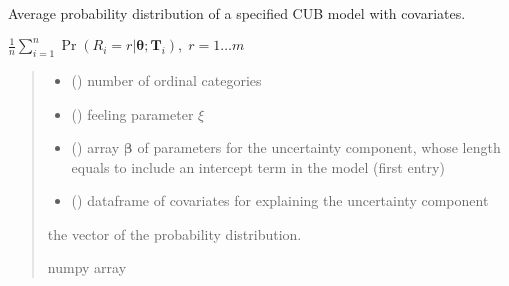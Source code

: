 \documentclass[letterpaper,10pt,english]{sphinxmanual}
\begin{document}
\begin{fulllineitems}
\label{\detokenize{cubmods:cubmods.cub_y0.pmf}}
\pysigstartsignatures
{}
\pysigstopsignatures
\sphinxAtStartPar
Average probability distribution of a specified CUB model 
with covariates.

\sphinxAtStartPar
\(\frac{1}{n} \sum_{i=1}^n \Pr(R_i=r|\pmb\theta; \pmb T_i),\; r=1 \ldots m\)
\begin{quote}\begin{description}
\begin{itemize}
\item {} 
\sphinxAtStartPar
{} () \textendash{} number of ordinal categories

\item {} 
\sphinxAtStartPar
{} () \textendash{} feeling parameter \(\xi\)

\item {} 
\sphinxAtStartPar
{} () \textendash{} array \(\pmb \beta\) of parameters for the uncertainty component, whose length equals 
 to include an intercept term in the model (first entry)

\item {} 
\sphinxAtStartPar
{} () \textendash{} dataframe of covariates for explaining the uncertainty component

\end{itemize}

\sphinxAtStartPar
the vector of the probability distribution.

\sphinxAtStartPar
numpy array

\end{description}\end{quote}

\end{fulllineitems}
\end{document}
